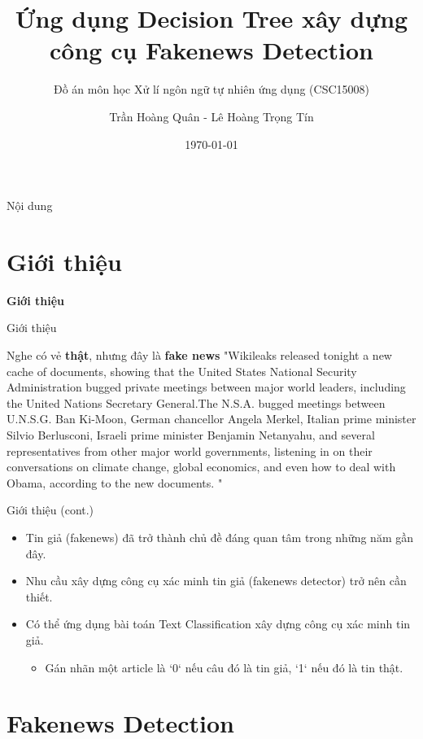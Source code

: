 \documentclass[aspectratio=169,xcolor=dvipsnames]{beamer}
\title[Fakenews Detection]{Ứng dụng Decision Tree xây dựng \\ công cụ Fakenews Detection}
\subtitle{Đồ án môn học Xử lí ngôn ngữ tự nhiên ứng dụng (CSC15008)}
\author[Quan-Tran] {Trần Hoàng Quân - Lê Hoàng Trọng Tín}
\institute[HCMUS]
{
    Khoa Công nghệ thông tin \\
    Trường Đại học Khoa học Tự nhiên - ĐHQG HCM
}
\date{\today}
\begin{document}
\begin{frame}
    \titlepage
\end{frame}

\begin{frame}{Nội dung}
    \tableofcontents
\end{frame}

\section{Giới thiệu}

\begin{frame}
	\Huge{\centerline{\textbf{Giới thiệu}}}
\end{frame}


\begin{frame}{Giới thiệu}
\begin{alertblock}{Nghe có vẻ \textbf{thật}, nhưng đây là \textbf{fake news}}
"Wikileaks released tonight a new cache of documents, showing that the United States  National Security Administration bugged private meetings between major world leaders, including the United Nations Secretary General.The N.S.A. bugged meetings between U.N.S.G. Ban Ki-Moon, German chancellor Angela Merkel, Italian prime minister Silvio Berlusconi, Israeli prime minister Benjamin Netanyahu, and several representatives from other major world governments, listening in on their conversations on climate change, global economics, and even  how to deal with Obama,  according to the new documents. "
\end{alertblock}
\end{frame}

\begin{frame}{Giới thiệu (cont.)}
\begin{itemize}
\item Tin giả (fakenews) đã trở thành chủ đề đáng quan tâm trong những năm gần đây.
\item Nhu cầu xây dựng công cụ xác minh tin giả (fakenews detector) trở nên cần thiết.
\item Có thể ứng dụng bài toán Text Classification xây dựng công cụ xác minh tin giả.
\begin{itemize}
    \item Gán nhãn một article là `0` nếu câu đó là tin giả, `1` nếu đó là tin thật.
\end{itemize}
\end{itemize}
\end{frame}

\section{Fakenews Detection}
\end{document}
